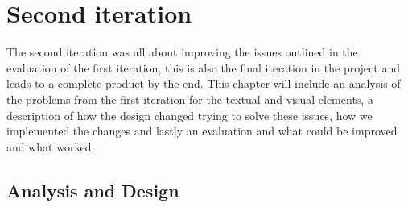 \chapter{Second iteration}
\label{chap:second-iteration}
The second iteration was all about improving the issues outlined in the evaluation of the first iteration, this is also the final iteration in the project and leads to a complete product by the end. This chapter will include an analysis of the problems from the first iteration for the textual and visual elements, a description of how the design changed trying to solve these issues, how we implemented the changes and lastly an evaluation and what could be improved and what worked.
\section{Analysis and Design}
\label{chap:second-analysis}


